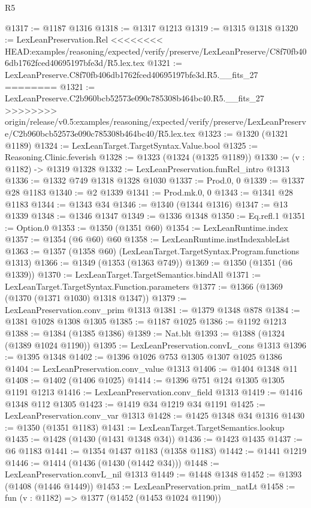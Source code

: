 \begin{lexlean}{R5}
\begin{coremodule}
{{{{{{{{{{{{{{{{{{{{{{{{{{{{{{{{{{{{{{{{{{{{{{{{{{{{{{{{{{{{{{{{{{{{{{{{{{{{{{{{{{{{@1317 := @1187 @1316
@1318 := @1317 @1213
@1319 := @1315 @1318
@1320 := LexLeanPreservation.Rel
<<<<<<<< HEAD:examples/reasoning/expected/verify/preserve/LexLeanPreserve/C8f70fb406db1762fced40695197bfe3d/R5.lex.tex
@1321 := LexLeanPreserve.C8f70fb406db1762fced40695197bfe3d.R5.__fits_27
========
@1321 := LexLeanPreserve.C2b960bcb52573e090c785308b464bc40.R5.__fits_27
>>>>>>>> origin/release/v0.5:examples/reasoning/expected/verify/preserve/LexLeanPreserve/C2b960bcb52573e090c785308b464bc40/R5.lex.tex
@1323 := @1320 (@1321 @1189)
@1324 := LexLeanTarget.TargetSyntax.Value.bool
@1325 := Reasoning.Clinic.feverish
@1328 := @1323 (@1324 (@1325 @1189))
@1330 := (v : @1182) -> @1319 @1328
@1332 := LexLeanPreservation.funRel_intro @1313
@1336 := @1332 @749 @1318 @1328 @1030
@1337 := Prod.{0, 0}
@1339 := @1337 @28 @1183
@1340 := @2 @1339
@1341 := Prod.mk.{0, 0}
@1343 := @1341 @28 @1183
@1344 := @1343 @34
@1346 := @1340 (@1344 @1316)
@1347 := @13 @1339
@1348 := @1346 @1347
@1349 := @1336 @1348
@1350 := Eq.refl.{1}
@1351 := Option.{0}
@1353 := @1350 (@1351 @60)
@1354 := LexLeanRuntime.index
@1357 := @1354 (@6 @60) @60
@1358 := LexLeanRuntime.instIndexableList
@1363 := @1357 (@1358 @60) (LexLeanTarget.TargetSyntax.Program.functions @1313)
@1366 := @1349 (@1353 (@1363 @749))
@1369 := @1350 (@1351 (@6 @1339))
@1370 := LexLeanTarget.TargetSemantics.bindAll
@1371 := LexLeanTarget.TargetSyntax.Function.parameters
@1377 := @1366 (@1369 (@1370 (@1371 @1030) @1318 @1347))
@1379 := LexLeanPreservation.conv_prim @1313
@1381 := @1379 @1348 @878
@1384 := @1381 @1028 @1308 @1305
@1385 := @1187 @1025
@1386 := @1192 @1213
@1388 := @1384 (@1385 @1386)
@1389 := Nat.blt
@1393 := @1388 (@1324 (@1389 @1024 @1190))
@1395 := LexLeanPreservation.convL_cons @1313
@1396 := @1395 @1348
@1402 := @1396 @1026 @753 @1305 @1307 @1025 @1386
@1404 := LexLeanPreservation.conv_value @1313
@1406 := @1404 @1348 @11
@1408 := @1402 (@1406 @1025)
@1414 := @1396 @751 @124 @1305 @1305 @1191 @1213
@1416 := LexLeanPreservation.conv_field @1313
@1419 := @1416 @1348 @112 @1305
@1423 := @1419 @34 @1219 @34 @1191
@1425 := LexLeanPreservation.conv_var @1313
@1428 := @1425 @1348 @34 @1316
@1430 := @1350 (@1351 @1183)
@1431 := LexLeanTarget.TargetSemantics.lookup
@1435 := @1428 (@1430 (@1431 @1348 @34))
@1436 := @1423 @1435
@1437 := @6 @1183
@1441 := @1354 @1437 @1183 (@1358 @1183)
@1442 := @1441 @1219
@1446 := @1414 (@1436 (@1430 (@1442 @34)))
@1448 := LexLeanPreservation.convL_nil @1313
@1449 := @1448 @1348
@1452 := @1393 (@1408 (@1446 @1449))
@1453 := LexLeanPreservation.prim_natLt
@1458 := fun (v : @1182) => @1377 (@1452 (@1453 @1024 @1190))
}}}}}}}}}}}}}}}}}}}}}}}}}}}}}}}}}}}}}}}}}}}}}}}}}}}}}}}}}}}}}}}}}}}}}}}}}}}}}}}}}}}}
\end{coremodule}
\end{lexlean}
